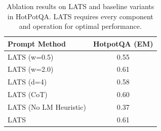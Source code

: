 \begin{table}[h]
\centering
\begin{tabular}{lc}
\toprule
\textbf{Prompt Method} & \textbf{HotpotQA (EM)} \\
\midrule
LATS (w=0.5) & 0.55 \\
LATS (w=2.0) & 0.61 \\
LATS (d=4) & 0.58 \\
LATS (CoT) & 0.60 \\
LATS (No LM Heuristic) & 0.37  \\
LATS & 0.61 \\
\bottomrule
\end{tabular}
\caption{Ablation results on LATS and baseline variants in HotPotQA. LATS requires every component and operation for optimal performance.}
\label{tab:lats_ablations}
\end{table}
